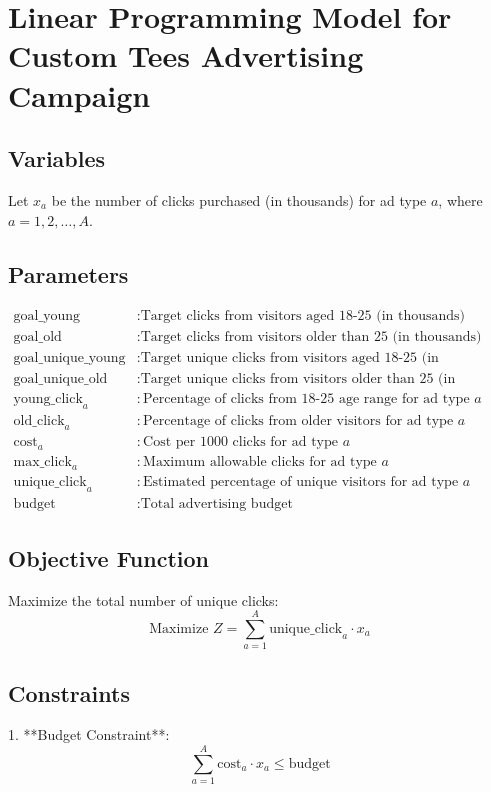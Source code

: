 \documentclass{article}
\begin{document}
\section*{Linear Programming Model for Custom Tees Advertising Campaign}

\subsection*{Variables}
Let \( x_a \) be the number of clicks purchased (in thousands) for ad type \( a \), where \( a = 1, 2, \ldots, A \).

\subsection*{Parameters}
\begin{align*}
\text{goal\_young} & : \text{Target clicks from visitors aged 18-25 (in thousands)} \\
\text{goal\_old} & : \text{Target clicks from visitors older than 25 (in thousands)} \\
\text{goal\_unique\_young} & : \text{Target unique clicks from visitors aged 18-25 (in thousands)} \\
\text{goal\_unique\_old} & : \text{Target unique clicks from visitors older than 25 (in thousands)} \\
\text{young\_click}_a & : \text{Percentage of clicks from 18-25 age range for ad type } a \\
\text{old\_click}_a & : \text{Percentage of clicks from older visitors for ad type } a \\
\text{cost}_a & : \text{Cost per 1000 clicks for ad type } a \\
\text{max\_click}_a & : \text{Maximum allowable clicks for ad type } a \\
\text{unique\_click}_a & : \text{Estimated percentage of unique visitors for ad type } a \\
\text{budget} & : \text{Total advertising budget}
\end{align*}

\subsection*{Objective Function}
Maximize the total number of unique clicks:
\[
\text{Maximize } Z = \sum_{a=1}^{A} \text{unique\_click}_a \cdot x_a
\]

\subsection*{Constraints}
1. **Budget Constraint**:
\[
\sum_{a=1}^{A} \text{cost}_a \cdot x_a \leq \text{budget}
\]
\end{document}
